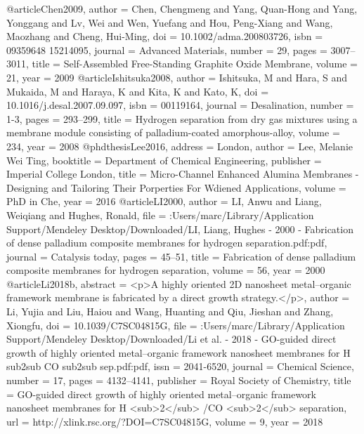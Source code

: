 @article{Chen2009,
author = {Chen, Chengmeng and Yang, Quan-Hong and Yang, Yonggang and Lv, Wei and Wen, Yuefang and Hou, Peng-Xiang and Wang, Maozhang and Cheng, Hui-Ming},
doi = {10.1002/adma.200803726},
isbn = {09359648
15214095},
journal = {Advanced Materials},
number = {29},
pages = {3007--3011},
title = {{Self-Assembled Free-Standing Graphite Oxide Membrane}},
volume = {21},
year = {2009}
}
@article{Ishitsuka2008,
author = {Ishitsuka, M and Hara, S and Mukaida, M and Haraya, K and Kita, K and Kato, K},
doi = {10.1016/j.desal.2007.09.097},
isbn = {00119164},
journal = {Desalination},
number = {1-3},
pages = {293--299},
title = {{Hydrogen separation from dry gas mixtures using a membrane module consisting of palladium-coated amorphous-alloy}},
volume = {234},
year = {2008}
}
@phdthesis{Lee2016,
address = {London},
author = {Lee, Melanie Wei Ting},
booktitle = {Department of Chemical Engineering},
publisher = {Imperial College London},
title = {{Micro-Channel Enhanced Alumina Membranes - Designing and Tailoring Their Porperties For Wdiened Applications}},
volume = {PhD in Che},
year = {2016}
}
@article{LI2000,
author = {LI, Anwu and Liang, Weiqiang and Hughes, Ronald},
file = {:Users/marc/Library/Application Support/Mendeley Desktop/Downloaded/LI, Liang, Hughes - 2000 - Fabrication of dense palladium composite membranes for hydrogen separation.pdf:pdf},
journal = {Catalysis today},
pages = {45--51},
title = {{Fabrication of dense palladium composite membranes for hydrogen separation}},
volume = {56},
year = {2000}
}
@article{Li2018b,
abstract = {{\textless}p{\textgreater}A highly oriented 2D nanosheet metal–organic framework membrane is fabricated by a direct growth strategy.{\textless}/p{\textgreater}},
author = {Li, Yujia and Liu, Haiou and Wang, Huanting and Qiu, Jieshan and Zhang, Xiongfu},
doi = {10.1039/C7SC04815G},
file = {:Users/marc/Library/Application Support/Mendeley Desktop/Downloaded/Li et al. - 2018 - GO-guided direct growth of highly oriented metal–organic framework nanosheet membranes for H sub2sub CO sub2sub sep.pdf:pdf},
issn = {2041-6520},
journal = {Chemical Science},
number = {17},
pages = {4132--4141},
publisher = {Royal Society of Chemistry},
title = {{GO-guided direct growth of highly oriented metal–organic framework nanosheet membranes for H {\textless}sub{\textgreater}2{\textless}/sub{\textgreater} /CO {\textless}sub{\textgreater}2{\textless}/sub{\textgreater} separation}},
url = {http://xlink.rsc.org/?DOI=C7SC04815G},
volume = {9},
year = {2018}
}
